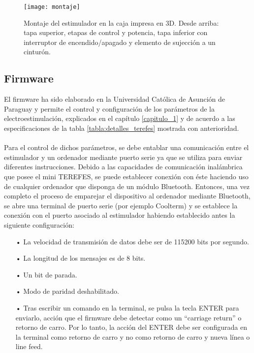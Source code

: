 \begin{figure}[!htb]
\centering
\texttt{[image: montaje]}
  \caption{Montaje del estimulador en la caja impresa en 3D. Desde arriba: tapa superior, etapas de control y potencia, tapa inferior con interruptor de encendido/apagado y elemento de sujección a un cinturón.}\label{fig:montaje}
\end{figure}


\subsection{Firmware}\label{firmware}
El firmware ha sido elaborado en la Universidad Católica de Asunción de Paraguay y permite el control y configuración de los parámetros de la electroestimulación, explicados en el capítulo \ref{capitulo_1} y de acuerdo a las especificaciones de la tabla \ref{tabla:detalles_terefes} mostrada con anterioridad.
\\
\\
Para el control de dichos parámetros, se debe entablar una comunicación entre el estimulador y un ordenador mediante puerto serie ya que se utiliza para enviar diferentes instrucciones. Debido a las capacidades de comunicación inalámbrica que posee el mini TEREFES, se puede establecer conexión con éste haciendo uso de cualquier ordenador que disponga de un módulo Bluetooth. Entonces, una vez completo el proceso de emparejar el dispositivo al ordenador mediante Bluetooth, se abre una terminal de puerto serie (por ejemplo Coolterm\cite{coolterm}) y se establece la conexión con el puerto asociado al estimulador habiendo establecido antes la siguiente configuración:

\begin{itemize}
\item[•] La velocidad de transmisión de datos debe ser de 115200 bits por segundo.
\item[•] La longitud de los mensajes es de 8 bits.
\item[•] Un bit de parada.
\item[•] Modo de paridad deshabilitado.
\item[•] Tras escribir un comando en la terminal, se pulsa la tecla ENTER para enviarlo, acción que el firmware debe detectar como un ``carriage return'' o retorno de carro. Por lo tanto, la acción del ENTER debe ser configurada en la terminal como retorno de carro y no como retorno de carro y nueva línea o line feed.
\end{itemize}

